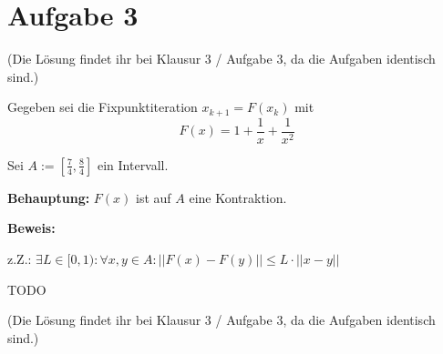 \section*{Aufgabe 3}

(Die Lösung findet ihr bei Klausur 3 / Aufgabe 3, da die Aufgaben identisch sind.)

Gegeben sei die Fixpunktiteration $x_{k+1} = F(x_k)$ mit
\[F(x) = 1 + \frac{1}{x} + \frac{1}{x^2}\]

Sei $A := [\frac{7}{4}, \frac{8}{4}]$ ein Intervall.

\textbf{Behauptung:} $F(x)$ ist auf $A$ eine Kontraktion.

\textbf{Beweis:}

z.Z.: $\exists L \in [0, 1): \forall x,y \in A: || F(x) - F(y) || \leq L \cdot || x - y||$

TODO


(Die Lösung findet ihr bei Klausur 3 / Aufgabe 3, da die Aufgaben identisch sind.)